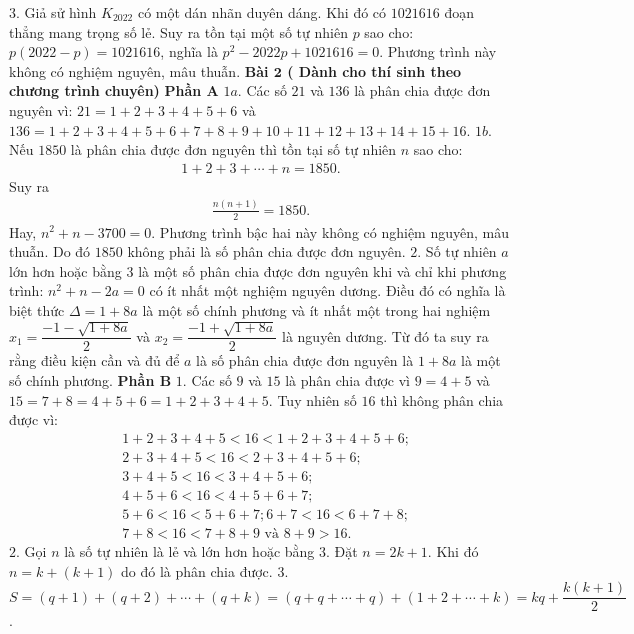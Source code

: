 \begin{multicols}{2}
	\vskip 0.1cm
	$3.$ Giả sử hình  $K_{2022}$ có một dán nhãn duyên dáng. Khi đó có $1 021 616$ đoạn thẳng mang trọng số lẻ. Suy ra tồn tại một số tự nhiên $p$ sao cho: $p(2022-p)=1 021 616$, nghĩa là $p^2-2022p+1 021 616=0$. Phương trình này không có nghiệm nguyên, mâu thuẫn. 
	\vskip 0.1cm
	\textbf{\color{cackithi}Bài $\pmb{2}$ ( Dành cho thí sinh theo chương trình chuyên)} 
	\vskip 0.1cm
	\textbf{\color{cackithi}Phần A}
	\vskip 0.1cm
	$1a$. Các số $21$ và $136$ là phân chia được đơn nguyên vì: $21=1+2+3+4+5+6$ và $136=1+2+3+4+5+6+7+8+9+10+11+12+13+14+15+16$.
	\vskip 0.1cm 
	$1b.$ Nếu $1850$ là phân chia được đơn nguyên thì tồn tại số tự nhiên $n$ sao cho: 
	\begin{align*}
		1+2+3+\cdots+n=1850.
	\end{align*}
	Suy ra 
	\begin{align*}
		\frac{n(n+1)}{2} = 1850.
	\end{align*}
	Hay, $n^2+n-3700=0$. Phương trình bậc hai này không có nghiệm nguyên, mâu thuẫn. Do đó $1850$ không phải là số phân chia được đơn nguyên. 
	\vskip 0.1cm
	$2.$ Số tự nhiên $a$ lớn hơn hoặc bằng $3$ là một số phân chia được đơn nguyên khi và chỉ khi phương trình: $n^2+n-2a=0$ có ít nhất một nghiệm nguyên dương. Điều đó có nghĩa là biệt thức $\Delta=1+8a$ là một số chính phương và ít nhất một trong hai nghiệm \linebreak$x_1=\dfrac{-1-\sqrt{1+ 8a}}{2}$ và $x_2=\dfrac{-1+\sqrt{1+ 8a}}{2}$ là nguyên dương. Từ đó ta suy ra rằng điều kiện cần và đủ để $a$ là số phân chia được đơn nguyên là $1+8a$ là một số chính phương.
	\vskip 0.1cm  
	\textbf{\color{cackithi}Phần B}
	\vskip 0.1cm
	$1.$ Các số $9$ và $15$ là phân chia được vì $9=4+5$ và $15=7+8=4+5+6=1+2+3+4+5$. Tuy nhiên số $16$ thì không phân chia được vì:
	\begin{align*}
		&1\!+\!2\!+\!3\!+\!4\!+\!5\!<\!16\!<\!1\!+\!2\!+\!3\!+\!4\!+\!5\!+\!6;\\
		&2+3+4+5<16<2+3+4+5+6;\\
		&3+4+5<16<3+4+5+6;\\
		&4+5+6<16<4+5+6+7;\\
		&5\!+\!6\!<\!16\!<\!5\!+\!6\!+\!7; 6\!+\!7\!<\!16\!<\!6\!+\!7\!+\!8;\\
		&7+8<16<7+8+9 \text{ và } 8+9>16.
	\end{align*}
	$2.$ Gọi $n$ là số tự nhiên là lẻ và lớn hơn hoặc bằng $3$. Đặt $n=2k+1$. Khi đó $n=k+(k+1)$ do đó là phân chia được.
	\vskip 0.1cm  
	$3.$ $S=(q+1)+(q+2)+\cdots+(q+k)=(q+q+\cdots+q)+(1+2+\cdots+k)=kq+\dfrac{k(k+1)}{2}$.
	\vskip 0.1cm

\end{multicols}
